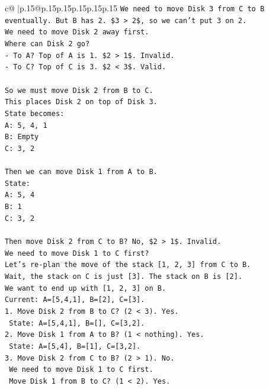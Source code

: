 \documentclass{article}
\begin{document}
{\begin{supertabular}{c@{$\;$}|p{.15\linewidth}@{}p{.15\linewidth}p{.15\linewidth}p{.15\linewidth}p{.15\linewidth}p{.15\linewidth}}
{{{\texttt{We need to move Disk 3 from C to B eventually. But B has 2. \$3 > 2\$, so we can't put 3 on 2.} \\
\texttt{We need to move Disk 2 away first.} \\
\texttt{Where can Disk 2 go?} \\
\texttt{{-} To A? Top of A is 1. \$2 > 1\$. Invalid.} \\
\texttt{{-} To C? Top of C is 3. \$2 < 3\$. Valid.} \\
\\ 
\texttt{So we must move Disk 2 from B to C.} \\
\texttt{This places Disk 2 on top of Disk 3.} \\
\texttt{State becomes:} \\
\texttt{A: 5, 4, 1} \\
\texttt{B: Empty} \\
\texttt{C: 3, 2} \\
\\ 
\texttt{Then we can move Disk 1 from A to B.} \\
\texttt{State:} \\
\texttt{A: 5, 4} \\
\texttt{B: 1} \\
\texttt{C: 3, 2} \\
\\ 
\texttt{Then move Disk 2 from C to B? No, \$2 > 1\$. Invalid.} \\
\texttt{We need to move Disk 1 to C first?} \\
\texttt{Let's re{-}plan the move of the stack {[}1, 2, 3{]} from C to B.} \\
\texttt{Wait, the stack on C is just {[}3{]}. The stack on B is {[}2{]}.} \\
\texttt{We want to end up with {[}1, 2, 3{]} on B.} \\
\texttt{Current: A={[}5,4,1{]}, B={[}2{]}, C={[}3{]}.} \\
\texttt{1. Move Disk 2 from B to C? (2 < 3). Yes.} \\
\texttt{   State: A={[}5,4,1{]}, B={[}{]}, C={[}3,2{]}.} \\
\texttt{2. Move Disk 1 from A to B? (1 < nothing). Yes.} \\
\texttt{   State: A={[}5,4{]}, B={[}1{]}, C={[}3,2{]}.} \\
\texttt{3. Move Disk 2 from C to B? (2 > 1). No.} \\
\texttt{   We need to move Disk 1 to C first.} \\
\texttt{   Move Disk 1 from B to C? (1 < 2). Yes.} \\
}}}
\end{supertabular}}
\end{document}
